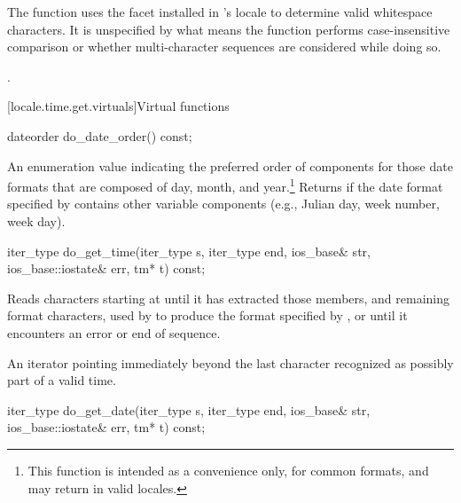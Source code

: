 \begin{itemdescr}
\pnum
\begin{note}
The function uses the 
facet installed in 's locale
to determine valid whitespace characters. It is unspecified by what
means the function performs case-insensitive comparison or whether
multi-character sequences are considered while doing so.
\end{note}

\pnum
\returns
{}.
\end{itemdescr}

[locale.time.get.virtuals]{Virtual functions}

%
\begin{itemdecl}
dateorder do_date_order() const;
\end{itemdecl}

\begin{itemdescr}
\pnum
\returns
An enumeration value indicating the preferred order of components for
those date formats that are composed of day, month, and year.\footnote{This
function is intended as a convenience only, for common
formats, and may return
in valid locales.}
Returns
if the date format specified by
contains other variable components (e.g., Julian day, week number, week day).
\end{itemdescr}

%
\begin{itemdecl}
iter_type do_get_time(iter_type s, iter_type end, ios_base& str,
                      ios_base::iostate& err, tm* t) const;
\end{itemdecl}

\begin{itemdescr}
\pnum
\effects
Reads characters starting at 
until it has extracted those
members, and remaining format characters, used by
to produce the format specified by
,
or until it encounters an error or end of sequence.

\pnum
\returns
An iterator pointing immediately beyond the last character recognized
as possibly part of a valid time.
\end{itemdescr}

%
\begin{itemdecl}
iter_type do_get_date(iter_type s, iter_type end, ios_base& str,
                      ios_base::iostate& err, tm* t) const;
\end{itemdecl}

